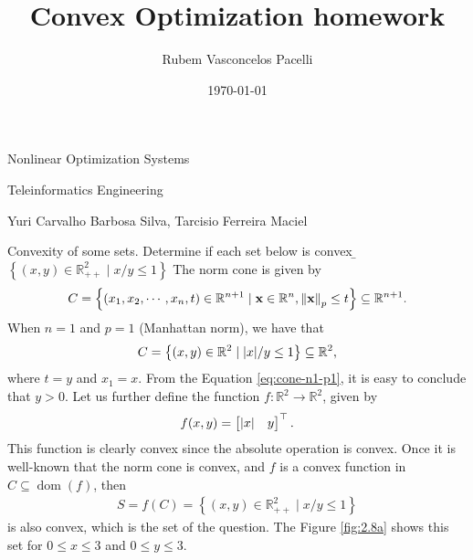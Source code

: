 \documentclass[12pt,a4paper]{article}
\newcommand{\dom}[1]{\ensuremath{\operatorname{dom}\left(#1\right)}} %
\begin{document}
\author{Rubem Vasconcelos Pacelli}
\title{Convex Optimization homework}
\date{\today}
\maketitle

\begin{center}
{\LARGE Nonlinear Optimization Systems \par}
{\Large Teleinformatics Engineering \par}
{\Large Yuri Carvalho Barbosa Silva, Tarcisio Ferreira Maciel \par}
\end{center}

\problem \label{probone}
Convexity of some sets. Determine if each set below is convex
\b
\subproblem  \(\left\{ (x,y) \in \mathbb{R}_{++}^{2} \mid x/y \leq 1 \right\}\)
\subanswer
The norm cone is given by
\begin{align}
    C = \left\{ (x_1, x_2, \cdots, x_n, t) \in \mathbb{R}^{n+1} \mid \mathbf{x} \in \mathbb{R}^{n}, \norm{\mathbf{x}}_{p} \leq t \right\} \subseteq \mathbb{R}^{n+1}.
\end{align}
When \(n=1\) and \(p=1\) (Manhattan norm), we have that
\begin{align}
    \label{eq:cone-n1-p1}
    C = \left\{ (x, y) \in \mathbb{R}^{2} \mid \abs{x}/y \leq 1 \right\} \subseteq \mathbb{R}^{2},
\end{align}
where \(t = y\) and \(x_1 = x\). From the Equation \eqref{eq:cone-n1-p1}, it is easy to conclude that \(y>0\).
Let us further define the function \(f: \mathbb{R}^2 \rightarrow \mathbb{R}^2\), given by
\begin{align}
    f(x, y) = \begin{bmatrix}
	\abs{x} & y
\end{bmatrix}^\top.
\end{align}
This function is clearly convex since the absolute operation is convex. Once it is well-known that the norm cone is convex, and \(f\) is a convex function in \(C \subseteq \dom{f}\), then
\begin{align}
    S = f(C) = \left\{ (x, y) \in \mathbb{R}^{2}_{++} \mid x/y \leq 1 \right\}
\end{align}
is also convex, which is the set of the question. The Figure \ref{fig:2.8a} shows this set for \(0\leq x \leq 3\) and \(0\leq y \leq 3\).
\end{document}
